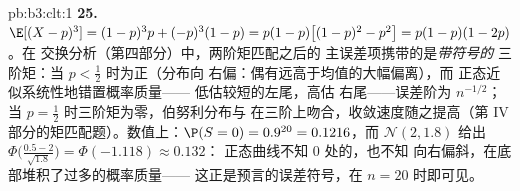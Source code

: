 \begin{solution}{pb:b3:clt:1}
\textbf{25.} $\E[(X - p)^3] = (1-p)^3p + (-p)^3(1 - p) =
p(1-p)\bigl[(1-p)^2 - p^2\bigr] = p(1-p)(1 - 2p)$。在
交换分析（第四部分）中，两阶矩匹配之后的
主误差项携带的是\emph{带符号的}
三阶矩：当 $p < \frac12$ 时为正（分布向
右偏：偶有远高于均值的大幅偏离），而
正态近似系统性地错置概率质量——
低估较短的左尾，高估
右尾——误差阶为 $n^{-1/2}$；当 $p =
\frac12$ 时三阶矩为零，伯努利分布与
在三阶上吻合，收敛速度随之提高（第
IV 部分的矩匹配题）。数值上：$\P(S = 0) =
0.9^{20} = 0.1216$，而
$\mathcal N(2, 1.8)$ 给出 $\Phi\bigl(\frac{0.5 -
2}{\sqrt{1.8}}\bigr) = \Phi(-1.118) \approx 0.132$：
正态曲线不知 $0$ 处的，也不知
向右偏斜，在底部堆积了过多的概率质量——
这正是预言的误差符号，在 $n = 20$ 时即可见。
\end{solution}

